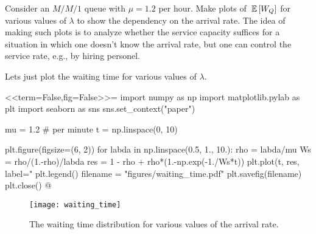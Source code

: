\begin{question}
  Consider an $M/M/1$ queue with $\mu=1.2$ per hour. Make plots of
  $\,\mathbb{E}\left[W_Q\right]$ for various values of $\lambda$ to show the dependency on
  the arrival rate. The idea of making such plots is to analyze
  whether the service capacity suffices for a situation in which one
  doesn't know the arrival rate, but one can control the service rate,
  e.g., by hiring personel.
  \begin{solution}
Lets just plot the waiting time for various values of $\lambda$.

<<term=False,fig=False>>=
import numpy as np
import matplotlib.pylab as plt
import seaborn as sns
sns.set_context("paper")

mu = 1.2 # per minute
t  = np.linspace(0, 10)

plt.figure(figsize=(6, 2))
for labda in np.linspace(0.5, 1., 10.):
   rho = labda/mu
   Ws = rho/(1.-rho)/labda
   res = 1 - rho + rho*(1.-np.exp(-1./Ws*t))
   plt.plot(t, res, label="%
plt.legend()
filename = "figures/waiting_time.pdf"
plt.savefig(filename)
plt.close()
@

\begin{figure}[ht]
  \centering
\texttt{[image: waiting\_time]}
  \caption{The waiting time distribution for various values of the arrival rate.}
  \label{fig:waitingtime}
\end{figure}


\end{solution}

\end{question}




